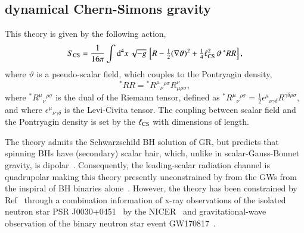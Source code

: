 \documentclass[twocolumn,
               prd,
               aps,
               superscriptaddress,
               tightenlines,
               nofootinbib,
               eqsecnum,
               amsfonts,
               amsmath,
               longbibliography]{revtex4-1}
\newcommand{\dV}{{\rm d}^{4}x \, \sqrt{-g} \,}
\begin{document}
%
%
%

\subsection{dynamical Chern-Simons gravity}

This theory is given by the following action,
%
\begin{equation} \label{eq:action_dcs}
    S_{\rm CS} = \frac{1}{16 \pi}
    \int \dV
    \left[
    R - \tfrac{1}{2}(\nabla \vartheta)^2
    + \tfrac{1}{4} \ell^{2}_{\rm CS} \, \vartheta \, {}^{*}RR
    \right],
\end{equation}
%
where $\vartheta$ is a pseudo-scalar field, which couples
to the Pontryagin density,
%
\begin{equation}
    {}^{*}RR = {}^{*}R^{\mu}{}_{\nu}{}^{\rho\sigma} R^{\nu}_{\mu\rho\sigma},
\end{equation}
%
where ${}^{*}R^{\mu}{}_{\nu}{}^{\rho\sigma}$ is the dual of the Riemann tensor,
defined as
%
${}^{*}R^{\mu}{}_{\nu}{}^{\rho\sigma} =
\tfrac{1}{2} \epsilon^{\mu}{}_{\nu\gamma\delta}
R^{\gamma\delta\rho\sigma}$,
%
and where $\epsilon^{\mu}{}_{\nu\gamma\delta}$ is the Levi-Civita tensor.
%
The coupling between scalar field and the Pontryagin density is set by the
$\ell_{\rm CS}$ with dimensions of length.

The theory admits the Schwarzschild BH solution of GR, but predicts
that spinning BHs have (secondary) scalar hair, which, unlike in
scalar-Gauss-Bonnet gravity, is dipolar~\cite{Yunes:2009hc,Konno:2009kg}.
%
Consequently, the leading-scalar radiation channel is quadrupolar making this
theory presently unconstrained by from the GWs from the inspiral of BH
binaries alone~\cite{Nair:2019iur,Perkins:2021mhb}.
%
However, the theory has been constrained by Ref~\cite{Silva:2020acr} through a
combination information of x-ray observations of the isolated neutron star PSR
J0030+0451~\cite{Lommen:2000yt,NANOGrav:2017wvv} by the
NICER~\cite{Riley:2019yda,Miller:2019cac} and gravitational-wave observation of
the binary neutron star event GW170817~\cite{TheLIGOScientific:2017qsa}.
\end{document}
